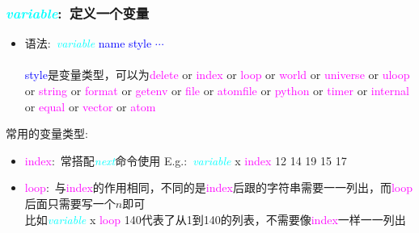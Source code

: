 \frame
{
	\frametitle{\textcolor{cyan}{\textit{variable}}:~定义一个变量}
	\begin{itemize}
		\item 语法:~\textcolor{cyan}{\textit{variable}} \textrm{\textcolor{blue}{name style $\cdots$}}\\
			{\fontsize{7.5pt}{5.2pt}}\\
			\textrm{\textcolor{blue}{style}}是变量类型，可以为\textrm{\textcolor{magenta}{delete} or \textcolor{magenta}{index} or \textcolor{magenta}{loop} or \textcolor{magenta}{world} or \textcolor{magenta}{universe} or \textcolor{magenta}{uloop} or \textcolor{magenta}{string} or \textcolor{magenta}{format} or \textcolor{magenta}{getenv} or \textcolor{magenta}{file} or \textcolor{magenta}{atomfile} or \textcolor{magenta}{python} or \textcolor{magenta}{timer} or \textcolor{magenta}{internal} or \textcolor{magenta}{equal} or \textcolor{magenta}{vector} or \textcolor{magenta}{atom}}
			\vskip 3pt
{\fontsize{6.2pt}{5.2pt}}
	\end{itemize}
	常用的变量类型:
	\begin{itemize}
		\item \textrm{\textcolor{magenta}{index}}:~常搭配\textcolor{cyan}{\textit{next}}命令使用%
			\textrm{E.g.:}~\textcolor{cyan}{\textit{variable}} \textrm{x} \textrm{\textcolor{magenta}{index}} \textrm{12 14 19 15 17}
\item \textrm{\textcolor{magenta}{loop}}:~与\textrm{\textcolor{magenta}{index}}的作用相同，不同的是\textrm{\textcolor{magenta}{index}}后跟的字符串需要一一列出，而\textrm{\textcolor{magenta}{loop}}后面只需要写一个$n$即可\\
	比如\textcolor{cyan}{\textit{variable}} \textrm{x} \textrm{\textcolor{magenta}{loop}} \textrm{140}代表了从1到140的列表，不需要像\textrm{\textcolor{magenta}{index}}一样一一列出
	\end{itemize}
}


